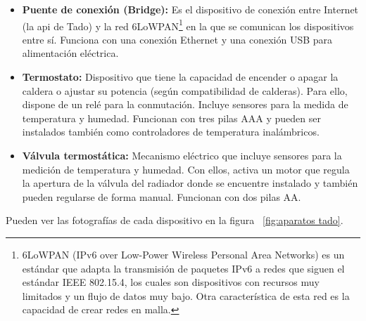 \documentclass[spanish,12pt, a4paper, twoside]{paper}
\begin{document}
\begin{itemize}
\item\textbf{Puente de conexión (Bridge):} Es el dispositivo de conexión entre Internet (la api de Tado) y la red 6LoWPAN\footnote{6LoWPAN (IPv6 over Low-Power Wireless Personal Area Networks) es un estándar que adapta la transmisión de paquetes IPv6 a redes que siguen el estándar IEEE 802.15.4, los cuales son dispositivos con recursos muy limitados y un flujo de datos muy bajo. Otra característica de esta red es la capacidad de crear redes en malla.} en la que se comunican los dispositivos entre sí. Funciona con una conexión Ethernet y una conexión USB para alimentación eléctrica.

\item\textbf{Termostato:} Dispositivo que tiene la capacidad de encender o apagar la caldera o ajustar su potencia (según compatibilidad de calderas). Para ello, dispone de un relé para la conmutación. Incluye sensores para la medida de temperatura y humedad. Funcionan con tres pilas AAA y pueden ser instalados también como controladores de temperatura inalámbricos.

\item\textbf{Válvula termostática:} Mecanismo eléctrico que incluye sensores para la medición de temperatura y humedad. Con ellos, activa un motor que regula la apertura de la válvula del radiador donde se encuentre instalado y también pueden regularse de forma manual. Funcionan con dos pilas AA.
\end{itemize}

Pueden ver las fotografías de cada dispositivo en la figura ~\ref{fig:aparatos tado}.
\newline
\end{document}
